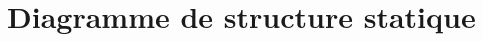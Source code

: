 \documentclass[a4paper]{article}
\begin{document}
\section{Diagramme de structure statique}

    \begin{figure}[p]
    \end{figure}
\end{document}
